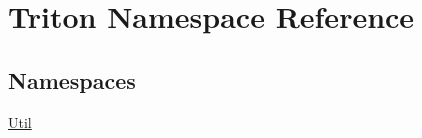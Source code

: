 \hypertarget{namespace_triton}{}\section{Triton Namespace Reference}
\label{namespace_triton}
\subsection*{Namespaces}
\begin{DoxyCompactItemize}
\item 
 \hyperlink{namespace_triton_1_1_util}{Util}
\end{DoxyCompactItemize}
